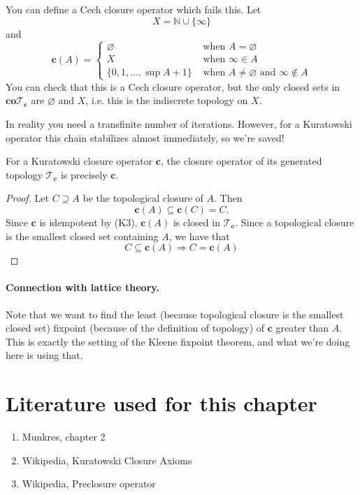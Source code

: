 \begin{example}
    You can define a Cech closure operator which fails this. Let
    \[
        X = \mathbb{N} \cup \{\infty\}
    \]
    and
    \[
        \mathbf{c}(A) = \begin{cases} 
            \varnothing &\text{ when } A = \varnothing \\
            X &\text{ when } \infty \in A \\
            \{0, 1, \ldots, \sup A + 1 \} &\text{ when } A \neq \varnothing \text{ and } \infty \not\in A
        \end{cases}
    \]
    You can check that this is a Cech closure operator, but the only closed sets in $\mathbf{co}\mathcal{T}_\mathbf{c}$ are $\varnothing$ and $X$, i.e. this is the indiscrete topology on $X$.
\end{example}
In reality you need a transfinite number of iterations. However, for a Kuratowski operator this chain stabilizes almost immediately, so we're saved!

\begin{lemma}
    For a Kuratowski closure operator $\mathbf{c}$, the closure operator of its generated topology $\mathcal{T}_\mathbf{c}$ is precisely $\mathbf{c}$.
\end{lemma}

\begin{proof}
    Let $C \supseteq A$ be the topological closure of $A$. Then
    \[
        \mathbf{c}(A) \subseteq \mathbf{c}(C) = C.
    \]
    Since $\mathbf{c}$ is idempotent by (K3), $\mathbf{c}(A)$ is closed in $\mathcal{T}_\mathbf{c}$. Since a topological closure is the smallest closed set containing $A$, we have that
    \[
        C \subseteq \mathbf{c}(A) \Rightarrow  C = \mathbf{c}(A)
    \]
\end{proof}

\paragraph{Connection with lattice theory.} Note that we want to find the least (because topological closure is the smallest closed set) fixpoint (because of the definition of topology) of $\mathbf{c}$ greater than $A$. This is exactly the setting of the Kleene fixpoint theorem, and what we're doing here is using that.


\section{Literature used for this chapter}
\begin{enumerate}
    \item Munkres, chapter 2
    \item Wikipedia, Kuratowski Closure Axioms
    \item Wikipedia, Preclosure operator
\end{enumerate}
